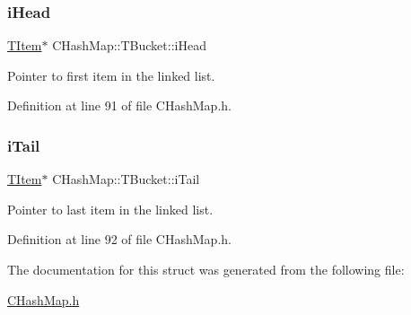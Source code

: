 \subsubsection{\texorpdfstring{i\+Head}{iHead}}
{\footnotesize\ttfamily \hyperlink{struct_c_hash_map_1_1_t_item}{T\+Item}$\ast$ C\+Hash\+Map\+::\+T\+Bucket\+::i\+Head}



Pointer to first item in the linked list. 



Definition at line 91 of file C\+Hash\+Map.\+h.

\mbox{\label{struct_c_hash_map_1_1_t_bucket_a1b8b634924907ed251a58eee989d577a}} 
\subsubsection{\texorpdfstring{i\+Tail}{iTail}}
{\footnotesize\ttfamily \hyperlink{struct_c_hash_map_1_1_t_item}{T\+Item}$\ast$ C\+Hash\+Map\+::\+T\+Bucket\+::i\+Tail}



Pointer to last item in the linked list. 



Definition at line 92 of file C\+Hash\+Map.\+h.



The documentation for this struct was generated from the following file\+:\begin{DoxyCompactItemize}
\item 
\hyperlink{_c_hash_map_8h}{C\+Hash\+Map.\+h}\end{DoxyCompactItemize}
